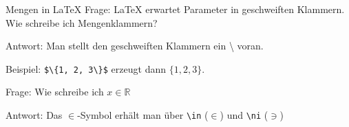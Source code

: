 \begin{frame}[fragile]{Mengen in \LaTeX{}}
Frage: \LaTeX{} erwartet Parameter in geschweiften Klammern. Wie schreibe ich Mengenklammern? 

\medskip\pause
Antwort: Man stellt den geschweiften Klammern ein \textbackslash{} voran. 

\medskip\pause
Beispiel: \verb+$\{1, 2, 3\}$+ erzeugt dann $\{1, 2, 3\}$.

\medskip\pause
Frage: Wie schreibe ich $x\in\mathbb{R}$

\medskip\pause
Antwort: Das $\in$-Symbol erhält man über \verb+\in+ ($\in$) und \verb+\ni+ ($\ni$)
\end{frame}